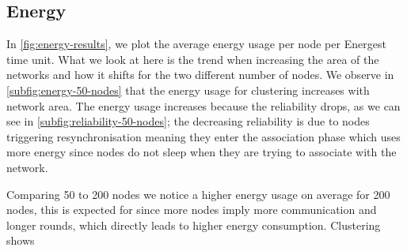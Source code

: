 \subsection{Energy}
In \cref{fig:energy-results}, we plot the average energy usage per node per Energest time unit. What we look at here is the trend when increasing the area of the networks and how it shifts for the two different number of nodes. We observe in \cref{subfig:energy-50-nodes} that the energy usage for clustering increases with network area. The energy usage increases because the reliability drops, as we can see in \cref{subfig:reliability-50-nodes}; the decreasing reliability is due to nodes triggering resynchronisation meaning they enter the association phase which uses more energy since nodes do not sleep when they are trying to associate with the network.

Comparing 50 to 200 nodes we notice a higher energy usage on average for 200 nodes, this is expected for \atwo{} since more nodes imply more communication and longer rounds, which directly leads to higher energy consumption. Clustering shows

